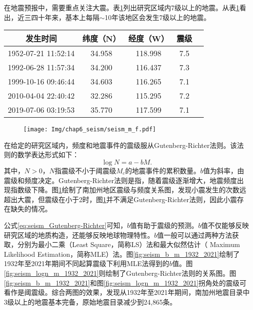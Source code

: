 在地震预报中，需要重点关注大震。表\ref{tab:seism_magnitude_7}列出研究区域内7级以上的地震。从表\ref{tab:seism_magnitude_7}看出，近三四十年来，基本上每隔$\sim$10年该地区会发生7级以上的地震。

\begin{table}[!htbp]
  \label{tab:seism_magnitude_7}
  \centering
  \footnotesize
  \begin{tabular}{ccccc} 
    \toprule
    发生时间 & 纬度（N） & 经度（W） & 震级 \\
    \midrule
    1952-07-21 11:52:14 & 34.958 & 118.998 & 7.5 \\
    1992-06-28 11:57:34 & 34.200 & 116.437 & 7.3 \\
    1999-10-16 09:46:44 & 34.603 & 116.265 & 7.1 \\
    2010-04-04 22:40:42 & 32.286 & 115.295 & 7.2 \\
    2019-07-06 03:19:53 & 35.770 & 117.599 & 7.1 \\
    \bottomrule
  \end{tabular}
\end{table}

\begin{figure}[!htbp]
  \centering
  \texttt{[image: Img/chap6\_seism/seism\_m\_f.pdf]}
  \vspace{-0.5cm}
  \label{fig:seism_m_f}
\end{figure}

在给定的研究区域内，频度和地震事件的震级服从Gutenberg-Richter法则\citep{Gutenberg1994Frequency,Panakkat2007Neural}。该法则的数学表达形式如下：
\begin{equation}
  \label{eq:seism_Gutenberg-Richter}
  \log N=a-bM.
\end{equation}
其中，$N>0$，$N$指震级不小于阈震级$M_c$的地震事件的累积数量。$b$值为斜率，由震级和频度决定。Gutenberg-Richter法则是指，随着震级逐渐增大，地震频度出现指数级下降\citep{Asim2018Earthquake}。图\ref{fig:seism_m_f}绘制了南加州地区震级与频度关系图，发现小震发生的次数远超出大震，但震级在小于2时，图\ref{fig:seism_m_f}并不满足Gutenberg-Richter法则，因此小震存在缺失的情况。

公式\ref{eq:seism_Gutenberg-Richter}可知，$b$值有助于震级的预测。$b$值不仅能够反映研究区域的地质构造，还能够反映地球物理特性。$b$值一般可以通过两种方法获取，分别为最小二乘（Least Square，简称LS）法和最大似然估计（ Maximum Likelihood Estimation，简称MLE）法。图\ref{fig:seism_b_m_1932_2021}绘制了1932年至2021年期间不同起算震级下利用MLE法得到的$b$值。图\ref{fig:seism_logn_m_1932_2021}则绘制了Gutenberg-Richter法则的关系图。图\ref{fig:seism_b_m_1932_2021}和图\ref{fig:seism_logn_m_1932_2021}拐角处的震级可看作是阈震级。综合两图的效果，发现从1932年至2021年期间，南加州地震目录中3级以上的地震基本完备，原始地震目录减少到24,865条。

